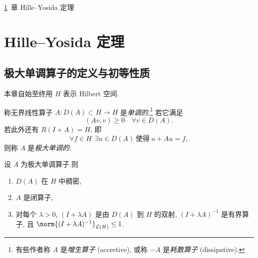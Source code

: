 \ref{chap:7}~章 
Hille--Yosida 定理

\chapter{Hille--Yosida 定理}
\label{chap:7}

\section{
极大单调算子的定义与初等性质}
\label{sec:7.1}

本章自始至终用 $H$ 表示 Hilbert 空间.

\begin{definition}
称无界线性算子 $A:D(A)\subset H\to H$ 是\emph{单调的},\footnote{有些作者称
$A$ 是\emph{增生算子} (accretive), 或称 $-A$ 是\emph{耗散算子}
(dissipative).} 若它满足
\begin{equation*}
(Av,v)\ge0\quad\forall v\in D(A).
\end{equation*}
若此外还有 $R(I+A)=H$, 即
\begin{equation*}
\forall f\in H\ \ \exists u\in D(A)\ \text{使得}\ u+Au=f,
\end{equation*}
则称 $A$ 是\emph{极大单调的}.
\end{definition}

\begin{proposition}
\label{prop:7.1}
设 $A$ 为极大单调算子.则
\begin{enumerate}[label=(\alph*), leftmargin=2.2em, itemsep=0.1em]
	\item $D(A)$ 在 $H$ 中稠密,
	\item $A$ 是闭算子,
	\item 对每个 $\lambda>0$, $(I+\lambda A)$ 是由 $D(A)$ 到 $H$ 的双射,
	      $(I+\lambda A)^{-1}$ 是有界算子, 且
	      $\norm{(I+\lambda A)^{-1}}_{\LL(H)}\le1$.
\end{enumerate}
\end{proposition}

